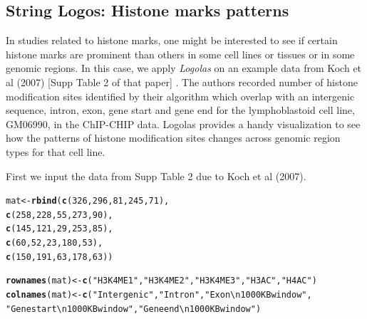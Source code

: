 \documentclass[12pt]{article}\usepackage[]{graphicx}\usepackage[usenames,dvipsnames]{color}
\makeatletter
\newcommand{\hlnum}[1]{\textcolor[rgb]{0.686,0.059,0.569}{#1}}%
\newcommand{\hlstr}[1]{\textcolor[rgb]{0.192,0.494,0.8}{#1}}%
\newcommand{\hlstd}[1]{\textcolor[rgb]{0.345,0.345,0.345}{#1}}%
\newcommand{\hlkwb}[1]{\textcolor[rgb]{0.69,0.353,0.396}{#1}}%
\newcommand{\hlkwd}[1]{\textcolor[rgb]{0.737,0.353,0.396}{\textbf{#1}}}%
\newenvironment{kframe}{%
 \def\at@end@of@kframe{}%
 \ifinner\ifhmode%
  \def\at@end@of@kframe{\end{minipage}}%
  \begin{minipage}{\columnwidth}%
 \fi\fi%
 \def\FrameCommand##1{\hskip\@totalleftmargin \hskip-\fboxsep
 \colorbox{shadecolor}{##1}\hskip-\fboxsep
     \hskip-\linewidth \hskip-\@totalleftmargin \hskip\columnwidth}%
 \MakeFramed {\advance\hsize-\width
   \@totalleftmargin\z@ \linewidth\hsize
   \@setminipage}}%
 {\par\unskip\endMakeFramed%
 \at@end@of@kframe}
\newenvironment{knitrout}{}{} %
\newcommand{\Logolas}{\textit{Logolas}}
\makeatother
\begin{document}
\newpage

\subsection{String Logos:  Histone marks patterns}

In studies related to histone marks, one might be interested to see if certain histone marks are prominent than others in some cell lines or tissues or in some genomic regions. In this case, we apply \Logolas{} on an example data from Koch et al (2007) [Supp Table 2 of that paper] \cite{Koch2007}. The authors recorded number of histone modification sites identified by their algorithm which overlap with an intergenic sequence, intron, exon, gene start and gene end for the lymphoblastoid cell line, GM06990, in the ChIP-CHIP data. Logolas provides a handy visualization to see how the patterns of histone modification sites changes across genomic region types for that cell line.

First we input the data from Supp Table 2 due to Koch et al (2007).

\begin{knitrout}
\color{fgcolor}\begin{kframe}
\begin{alltt}
\hlstd{mat} \hlkwb{<-} \hlkwd{rbind}\hlstd{(}\hlkwd{c}\hlstd{(}\hlnum{326}\hlstd{,} \hlnum{296}\hlstd{,} \hlnum{81}\hlstd{,} \hlnum{245}\hlstd{,} \hlnum{71}\hlstd{),}
             \hlkwd{c}\hlstd{(}\hlnum{258}\hlstd{,} \hlnum{228}\hlstd{,} \hlnum{55}\hlstd{,} \hlnum{273}\hlstd{,} \hlnum{90}\hlstd{),}
             \hlkwd{c}\hlstd{(}\hlnum{145}\hlstd{,} \hlnum{121}\hlstd{,} \hlnum{29}\hlstd{,} \hlnum{253}\hlstd{,} \hlnum{85}\hlstd{),}
             \hlkwd{c}\hlstd{(}\hlnum{60}\hlstd{,} \hlnum{52}\hlstd{,} \hlnum{23}\hlstd{,} \hlnum{180}\hlstd{,} \hlnum{53}\hlstd{),}
             \hlkwd{c}\hlstd{(}\hlnum{150}\hlstd{,} \hlnum{191}\hlstd{,} \hlnum{63}\hlstd{,} \hlnum{178}\hlstd{,} \hlnum{63}\hlstd{))}

\hlkwd{rownames}\hlstd{(mat)} \hlkwb{<-} \hlkwd{c}\hlstd{(}\hlstr{"H3K4ME1"}\hlstd{,} \hlstr{"H3K4ME2"}\hlstd{,} \hlstr{"H3K4ME3"}\hlstd{,} \hlstr{"H3AC"}\hlstd{,} \hlstr{"H4AC"}\hlstd{)}
\hlkwd{colnames}\hlstd{(mat)} \hlkwb{<-} \hlkwd{c}\hlstd{(}\hlstr{"Intergenic"}\hlstd{,}\hlstr{"Intron"}\hlstd{,}\hlstr{"Exon \textbackslash{}n 1000 KB window"}\hlstd{,}
                   \hlstr{"Gene start \textbackslash{}n 1000 KB window"}\hlstd{,}\hlstr{"Gene end \textbackslash{}n 1000 KB window"}\hlstd{)}
\end{alltt}
\end{kframe}
\end{knitrout}
\end{document}
